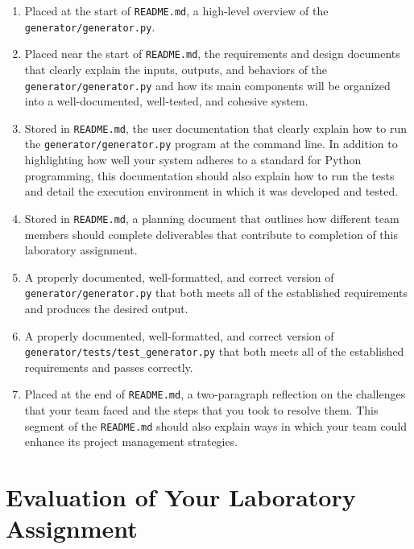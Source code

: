 \documentclass[11pt]{article}
\newcommand{\mainprogramsource}{\lstinline{generator/generator.py}}
\newcommand{\maintestsource}{\lstinline{generator/tests/test_generator.py}}
\newcommand{\reflection}{\lstinline{README.md}}
\begin{document}
\begin{enumerate}

\setlength{\itemsep}{0in}

\item Placed at the start of \reflection{}, a high-level overview of the \mainprogramsource{}.

\item Placed near the start of \reflection{}, the requirements and design documents that clearly explain the inputs,
  outputs, and behaviors of the \mainprogramsource{} and how its main components will be organized into a
  well-documented, well-tested, and cohesive system.

\item Stored in \reflection{}, the user documentation that clearly explain how to run the \mainprogramsource{} program
  at the command line. In addition to highlighting how well your system adheres to a standard for Python programming,
  this documentation should also explain how to run the tests and detail the execution environment in which it was
  developed and tested.

\item Stored in \reflection{}, a planning document that outlines how different team members should complete deliverables
  that contribute to completion of this laboratory assignment.

\item A properly documented, well-formatted, and correct version of \mainprogramsource{} that both meets all of the
  established requirements and produces the desired output.

\item A properly documented, well-formatted, and correct version of \maintestsource{} that both meets all of the
  established requirements and passes correctly.

\item Placed at the end of \reflection{}, a two-paragraph reflection on the challenges that your team faced and the
  steps that you took to resolve them. This segment of the \reflection{} should also explain ways in which your team
  could enhance its project management strategies.

\end{enumerate}

\section*{Evaluation of Your Laboratory Assignment}
\end{document}
